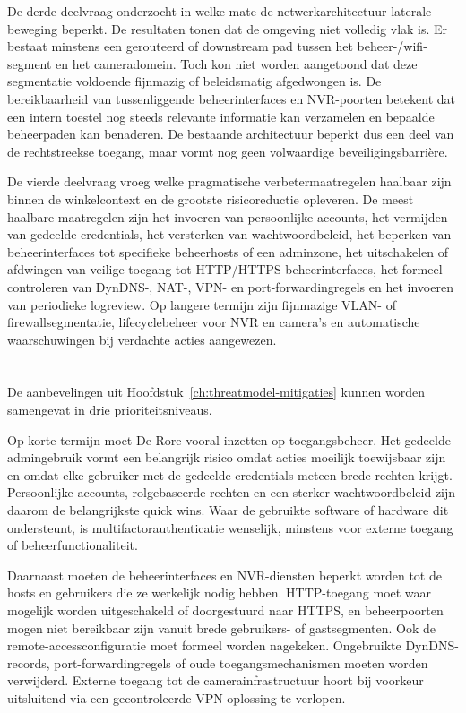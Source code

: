 De derde deelvraag onderzocht in welke mate de netwerkarchitectuur laterale beweging beperkt. De resultaten tonen dat de omgeving niet volledig vlak is. Er bestaat minstens een gerouteerd of downstream pad tussen het beheer-/wifi-segment en het cameradomein. Toch kon niet worden aangetoond dat deze segmentatie voldoende fijnmazig of beleidsmatig afgedwongen is. De bereikbaarheid van tussenliggende beheerinterfaces en NVR-poorten betekent dat een intern toestel nog steeds relevante informatie kan verzamelen en bepaalde beheerpaden kan benaderen. De bestaande architectuur beperkt dus een deel van de rechtstreekse toegang, maar vormt nog geen volwaardige beveiligingsbarrière.

De vierde deelvraag vroeg welke pragmatische verbetermaatregelen haalbaar zijn binnen de winkelcontext en de grootste risicoreductie opleveren. De meest haalbare maatregelen zijn het invoeren van persoonlijke accounts, het vermijden van gedeelde credentials, het versterken van wachtwoordbeleid, het beperken van beheerinterfaces tot specifieke beheerhosts of een adminzone, het uitschakelen of afdwingen van veilige toegang tot HTTP/HTTPS-beheerinterfaces, het formeel controleren van DynDNS-, NAT-, VPN- en port-forwardingregels en het invoeren van periodieke logreview. Op langere termijn zijn fijnmazige VLAN- of firewallsegmentatie, lifecyclebeheer voor NVR en camera's en automatische waarschuwingen bij verdachte acties aangewezen.

\section{}%
\label{sec:conclusie-aanbevelingen}

De aanbevelingen uit Hoofdstuk~\ref{ch:threatmodel-mitigaties} kunnen worden samengevat in drie prioriteitsniveaus.

Op korte termijn moet De Rore vooral inzetten op toegangsbeheer. Het gedeelde admingebruik vormt een belangrijk risico omdat acties moeilijk toewijsbaar zijn en omdat elke gebruiker met de gedeelde credentials meteen brede rechten krijgt. Persoonlijke accounts, rolgebaseerde rechten en een sterker wachtwoordbeleid zijn daarom de belangrijkste quick wins. Waar de gebruikte software of hardware dit ondersteunt, is multifactorauthenticatie wenselijk, minstens voor externe toegang of beheerfunctionaliteit.

Daarnaast moeten de beheerinterfaces en NVR-diensten beperkt worden tot de hosts en gebruikers die ze werkelijk nodig hebben. HTTP-toegang moet waar mogelijk worden uitgeschakeld of doorgestuurd naar HTTPS, en beheerpoorten mogen niet bereikbaar zijn vanuit brede gebruikers- of gastsegmenten. Ook de remote-accessconfiguratie moet formeel worden nagekeken. Ongebruikte DynDNS-records, port-forwardingregels of oude toegangsmechanismen moeten worden verwijderd. Externe toegang tot de camerainfrastructuur hoort bij voorkeur uitsluitend via een gecontroleerde VPN-oplossing te verlopen.

